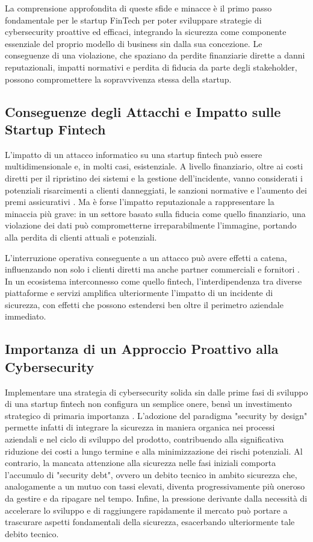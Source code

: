 La comprensione approfondita di queste sfide e minacce è il primo passo fondamentale per le startup FinTech per poter sviluppare strategie di cybersecurity proattive ed efficaci, integrando la sicurezza come componente essenziale del proprio modello di business sin dalla sua concezione. Le conseguenze di una violazione, che spaziano da perdite finanziarie dirette a danni reputazionali, impatti normativi e perdita di fiducia da parte degli stakeholder, possono compromettere la sopravvivenza stessa della startup.


\subsection{Conseguenze degli Attacchi e Impatto sulle Startup Fintech}

L'impatto di un attacco informatico su una startup fintech può essere multidimensionale e, in molti casi, esistenziale. A livello finanziario, oltre ai costi diretti per il ripristino dei sistemi e la gestione dell'incidente, vanno considerati i potenziali risarcimenti a clienti danneggiati, le sanzioni normative e l'aumento dei premi assicurativi \cite{fintechChallenges}. Ma è forse l'impatto reputazionale a rappresentare la minaccia più grave: in un settore basato sulla fiducia come quello finanziario, una violazione dei dati può comprometterne irreparabilmente l'immagine, portando alla perdita di clienti attuali e potenziali.


L'interruzione operativa conseguente a un attacco può avere effetti a catena, influenzando non solo i clienti diretti ma anche partner commerciali e fornitori \cite{fintechChallenges}. In un ecosistema interconnesso come quello fintech, l'interdipendenza tra diverse piattaforme e servizi amplifica ulteriormente l'impatto di un incidente di sicurezza, con effetti che possono estendersi ben oltre il perimetro aziendale immediato.

\subsection{Importanza di un Approccio Proattivo alla Cybersecurity}

Implementare una strategia di cybersecurity solida sin dalle prime fasi di sviluppo di una startup fintech non configura un semplice onere, bensì un investimento strategico di primaria importanza \cite{fintechChallenges}. L'adozione del paradigma "security by design" permette infatti di integrare la sicurezza in maniera organica nei processi aziendali e nel ciclo di sviluppo del prodotto, contribuendo alla significativa riduzione dei costi a lungo termine e alla minimizzazione dei rischi potenziali. Al contrario, la mancata attenzione alla sicurezza nelle fasi iniziali comporta l'accumulo di "security debt", ovvero un debito tecnico in ambito sicurezza che, analogamente a un mutuo con tassi elevati, diventa progressivamente più oneroso da gestire e da ripagare nel tempo. Infine, la pressione derivante dalla necessità di accelerare lo sviluppo e di raggiungere rapidamente il mercato può portare a trascurare aspetti fondamentali della sicurezza, esacerbando ulteriormente tale debito tecnico.



